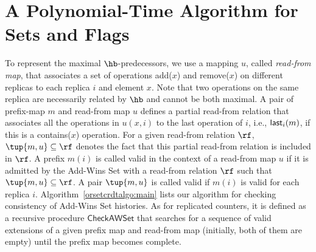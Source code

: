 
\section{A Polynomial-Time Algorithm for Sets and Flags}
\label{sec:ptime:sets:appendix}

To represent the maximal $\hb$-predecessors, we use a mapping $u$, called \emph{read-from map}, that associates a set of operations {\sf add}($x$) and {\sf remove}($x$) on different replicas to each replica $i$ and element $x$. Note that two operations on the same replica are necessarily related by $\hb$ and cannot be both maximal. A pair of prefix-map $m$ and read-from map $u$ defines a partial read-from relation that associates all the operations in $u(x,i)$ to the last operation of $i$, i.e., ${\sf last}_i(m)$, if this is a {\sf contains}($x$) operation. For a given read-from relation $\rf$, $\tup{m,u}\subseteq \rf$ denotes the fact that this partial read-from relation is included in $\rf$. A prefix $m(i)$ is called valid in the context of a read-from map $u$ if it is admitted by the Add-Wins Set with a read-from relation $\rf$ such that $\tup{m,u}\subseteq \rf$. A pair $\tup{m,u}$ is called valid if $m(i)$ is valid for each replica $i$.
Algorithm~\ref{orsetcrdtalgo:main} lists our algorithm for checking consistency of Add-Wins Set histories. As for replicated counters, it is defined as a recursive procedure $\mathsf{CheckAWSet}$ that searches for a sequence of valid extensions of a given prefix map and read-from map (initially, both of them are empty) until the prefix map becomes complete.

